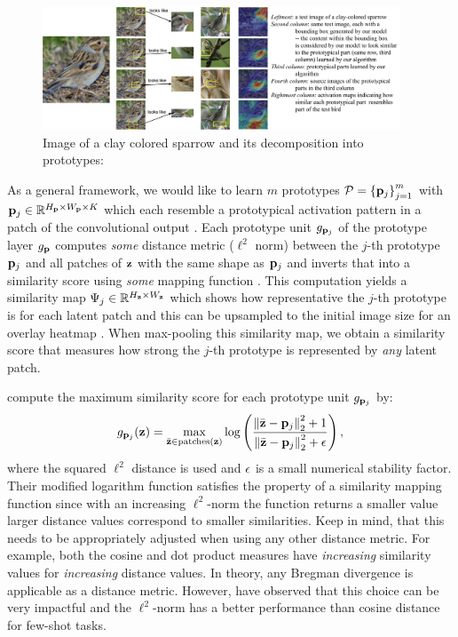 \begin{figure}[h]
    \centering
    \includegraphics[width=0.95\textwidth]{Figures/Chapter3/introbird-1.png}
    \caption[Image of a clay colored sparrow and its decomposition into prototypes]{Image of a clay colored sparrow and its decomposition into prototypes: \citep{ChenLTBRS19}}
    \label{fig:looke_like}
\end{figure}
As a general framework, we would like to learn $m$ prototypes $\mathcal{P}=\left\{\mathbf{p}_{j}\right\}_{j=1}^{m}$ with $\mathbf{p}_{j} \in \mathbb{R}^{H_{\mathbf{p}} \times W_{\mathbf{p}} \times K}$ which each resemble a prototypical activation pattern in a patch of the convolutional output \citep{ChenLTBRS19}. Each prototype unit $g_{\mathbf{p}_{j}}$ of the prototype layer $g_{\mathbf{p}}$ computes \emph{some} distance metric (\eg $\ell^2$ norm) between the $j$-th prototype $\mathbf{p}_{j}$ and all patches of $\mathbf{z}$ with the same shape as $\mathbf{p}_{j}$ and inverts that into a similarity score using \emph{some} mapping function \citep{ChenLTBRS19}. This computation yields a similarity map $\Psi_j \in \mathbb{R}^{H_{\mathbf{z}} \times W_{\mathbf{z}}}$ which shows how representative the $j$-th prototype is for each latent patch and this can be upsampled to the initial image size for an overlay heatmap \citep{ChenLTBRS19}. When max-pooling this similarity map, we obtain a similarity score that measures how strong the $j$-th prototype is represented by \emph{any} latent patch. 

\citet{ChenLTBRS19} compute the maximum similarity score for each prototype unit $g_{\mathbf{p}_{j}}$ by:
\begin{equation}
\label{eq:prot_layer_function}
    g_{\mathbf{p}_{j}}(\mathbf{z}) = \max_{\Bar{\mathbf{z}} \in \text{patches}(\mathbf{z})} \log \left( \frac{\left\|\Bar{\mathbf{z}} - \mathbf{p}_{j}\right\|^2_2 + 1}{\left\|\Bar{\mathbf{z}} - \mathbf{p}_{j}\right\|^2_2 + \epsilon} \right),
\end{equation}
where the squared $\ell^2$ distance is used and $\epsilon$ is a small numerical stability factor. Their modified logarithm function satisfies the property of a similarity mapping function since with an increasing $\ell^2$-norm the function returns a smaller value \ie larger distance values correspond to smaller similarities. Keep in mind, that this needs to be appropriately adjusted when using any other distance metric. For example, both the cosine and dot product measures have \emph{increasing} similarity values for \emph{increasing} distance values. In theory, any Bregman divergence \citep{BanerjeeMDG04} is applicable as a distance metric. However, \citet{SnellSZ17} have observed that this choice can be very impactful and the $\ell^2$-norm has a better performance than cosine distance for few-shot tasks. 

